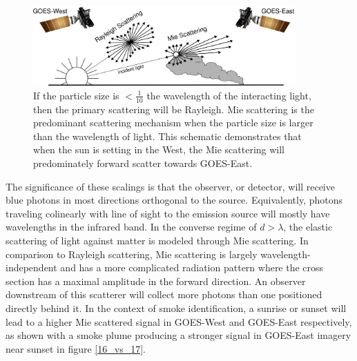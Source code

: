 \documentclass{article}
\begin{document}

\begin{figure}
    \centering
    \includegraphics[width=10cm]{figures/mei.png}
    \caption{If the particle size is \(<\frac{1}{10}\) the wavelength of the interacting light, then the primary scattering will be Rayleigh. Mie scattering is the predominant scattering mechanism when the particle size is larger than the wavelength of light. This schematic demonstrates that when the sun is setting in the West, the Mie scattering will predominately forward scatter towards GOES-East.} \label{mei}
\end{figure}

The significance of these scalings is that the observer, or detector, will receive blue photons in most directions orthogonal to the source. Equivalently, photons traveling colinearly with line of sight to the emission source will mostly have wavelengths in the infrared band.  In the converse regime of \(d > \lambda\), the elastic scattering of light against matter is modeled through Mie scattering. In comparison to Rayleigh scattering, Mie scattering is largely wavelength-independent and has a more complicated radiation pattern where the cross section has a maximal amplitude in the forward direction. An observer downstream of this scatterer will collect more photons than one positioned directly behind it. In the context of smoke identification, a sunrise or sunset will lead to a higher Mie scattered signal in GOES-West and GOES-East respectively, as shown with a smoke plume producing a stronger signal in GOES-East imagery near sunset in figure \ref{16_vs_17}.
\end{document}
